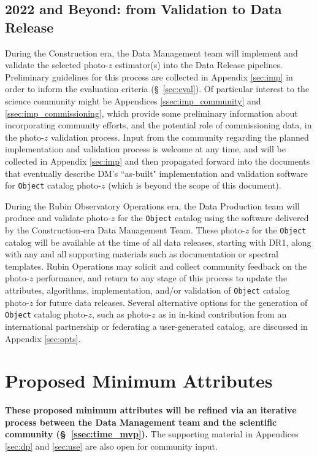 \documentclass[DM,lsstdraft,toc]{lsstdoc}
\begin{document}
\subsection{2022 and Beyond: from Validation to Data Release}\label{ssec:time_opsdr}

During the Construction era, the Data Management team will implement and validate the selected photo-$z$ estimator(s) into the Data Release pipelines.
Preliminary guidelines for this process are collected in Appendix \ref{sec:imp} in order to inform the evaluation criteria (\S~\ref{sec:eval}).
Of particular interest to the science community might be Appendices \ref{ssec:imp_community} and \ref{ssec:imp_commissioning}, which provide some preliminary information about incorporating community efforts, and the potential role of commissioning data, in the photo-$z$ validation process.
Input from the community regarding the planned implementation and validation process is welcome at any time, and will be collected in Appendix \ref{sec:imp} and then propagated forward into the documents that eventually describe DM's ``as-built" implementation and validation software for {\tt Object} catalog photo-$z$ (which is beyond the scope of this document). 

During the Rubin Observatory Operations era, the Data Production team will produce and validate photo-$z$ for the {\tt Object} catalog using the software delivered by the Construction-era Data Management Team.
These photo-$z$ for the {\tt Object} catalog will be available at the time of all data releases, starting with DR1, along with any and all supporting materials such as documentation or spectral templates.
Rubin Operations may solicit and collect community feedback on the photo-$z$ performance, and return to any stage of this process to update the attributes, algorithms, implementation, and/or validation of {\tt Object} catalog photo-$z$ for future data releases.
Several alternative options for the generation of {\tt Object} catalog photo-$z$, such as photo-$z$ as in in-kind contribution from an international partnership or federating a user-generated catalog, are discussed in Appendix \ref{sec:opts}.


\clearpage
\section{Proposed Minimum Attributes}\label{sec:mvp}

\textbf{These proposed minimum attributes will be refined via an iterative process between the Data Management team and the scientific community (\S~\ref{ssec:time_mvp}).} The supporting material in Appendices \ref{sec:dp} and \ref{sec:use} are also open for community input.
\end{document}
